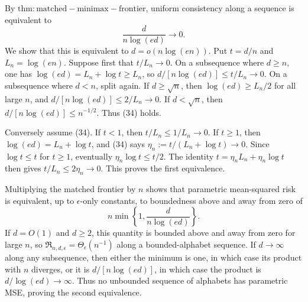 By \(\mathrm{thm:matched-minimax-frontier}\), uniform consistency along a sequence is equivalent to
\[
 \frac{d}{n\log(ed)}\longrightarrow0.                                \tag{34}
\]
We show that this is equivalent to \(d=o(n\log(en))\).  Put \(t=d/n\) and \(L_n=\log(en)\).  Suppose first that \(t/L_n\to0\).  On a subsequence where \(d\geq n\), one has \(\log(ed)=L_n+\log t\geq L_n\), so \(d/[n\log(ed)]\leq t/L_n\to0\).  On a subsequence where \(d<n\), split again.  If \(d\geq\sqrt n\), then \(\log(ed)\geq L_n/2\) for all large \(n\), and \(d/[n\log(ed)]\leq2/L_n\to0\).  If \(d<\sqrt n\), then \(d/[n\log(ed)]\leq n^{-1/2}\).  Thus (34) holds.

Conversely assume (34).  If \(t<1\), then \(t/L_n\leq1/L_n\to0\).  If \(t\geq1\), then \(\log(ed)=L_n+\log t\), and (34) says \(\eta_n:=t/(L_n+\log t)\to0\).  Since \(\log t\leq t\) for \(t\geq1\), eventually \(\eta_n\log t\leq t/2\).  The identity \(t=\eta_nL_n+\eta_n\log t\) then gives \(t/L_n\leq2\eta_n\to0\).  This proves the first equivalence.

Multiplying the matched frontier by \(n\) shows that parametric mean-squared risk is equivalent, up to \(\epsilon\)-only constants, to boundedness above and away from zero of
\[
 n\min\left\{1,\frac d{n\log(ed)}\right\}.
\]
If \(d=O(1)\) and \(d\geq2\), this quantity is bounded above and away from zero for large \(n\), so \(\mathfrak R_{n,d,\epsilon}=\Theta_\epsilon(n^{-1})\) along a bounded-alphabet sequence.  If \(d\to\infty\) along any subsequence, then either the minimum is one, in which case its product with \(n\) diverges, or it is \(d/[n\log(ed)]\), in which case the product is \(d/\log(ed)\to\infty\).  Thus no unbounded sequence of alphabets has parametric MSE, proving the second equivalence.